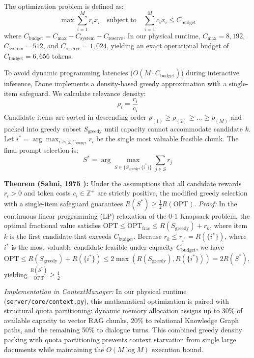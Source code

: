 \documentclass[conference,a4paper]{IEEEtran}
\begin{document}
The optimization problem is defined as:
\begin{equation}
\max \sum_{i=1}^{M} r_i x_i \quad \text{subject to} \quad \sum_{i=1}^{M} c_i x_i \le C_{\text{budget}}
\end{equation}
where $C_{\text{budget}} = C_{\text{max}} - C_{\text{system}} - C_{\text{reserve}}$. In our physical runtime, $C_{\text{max}} = 8{,}192$, $C_{\text{system}} = 512$, and $C_{\text{reserve}} = 1{,}024$, yielding an exact operational budget of $C_{\text{budget}} = 6{,}656$ tokens.

To avoid dynamic programming latencies ($O(M \cdot C_{\text{budget}})$) during interactive inference, Dione implements a density-based greedy approximation with a single-item safeguard. We calculate relevance density:
\begin{equation}
\rho_i = \frac{r_i}{c_i}
\end{equation}
Candidate items are sorted in descending order $\rho_{(1)} \ge \rho_{(2)} \ge \dots \ge \rho_{(M)}$ and packed into greedy subset $S_{\text{greedy}}$ until capacity cannot accommodate candidate $k$. Let $i^* = \arg\max_{i: c_i \le C_{\text{budget}}} r_i$ be the single most valuable feasible chunk. The final prompt selection is:
\begin{equation}
S^* = \arg\max_{S \in \{S_{\text{greedy}}, \{i^*\}\}} \sum_{j \in S} r_j
\end{equation}

\textbf{Theorem (Sahni, 1975 \cite{sahni1975approximate}):} Under the assumptions that all candidate rewards $r_i > 0$ and token costs $c_i \in \mathbb{Z}^+$ are strictly positive, the modified greedy selection with a single-item safeguard guarantees $R(S^*) \ge \frac{1}{2} R(\text{OPT})$.  
\textit{Proof:} In the continuous linear programming (LP) relaxation of the 0-1 Knapsack problem, the optimal fractional value satisfies $\text{OPT} \le \text{OPT}_{\text{frac}} \le R(S_{\text{greedy}}) + r_k$, where item $k$ is the first candidate that exceeds $C_{\text{budget}}$. Because $r_k \le r_{i^*} = R(\{i^*\})$, where $i^*$ is the most valuable candidate feasible under capacity $C_{\text{budget}}$, we have $\text{OPT} \le R(S_{\text{greedy}}) + R(\{i^*\}) \le 2 \max\left(R(S_{\text{greedy}}), R(\{i^*\})\right) = 2 R(S^*)$, yielding $\frac{R(S^*)}{\text{OPT}} \ge \frac{1}{2}$. 

\textit{Implementation in ContextManager:} In our physical runtime (\texttt{server/core/context.py}), this mathematical optimization is paired with structural quota partitioning: dynamic memory allocation assigns up to 30\% of available capacity to vector RAG chunks, 20\% to relational Knowledge Graph paths, and the remaining 50\% to dialogue turns. This combined greedy density packing with quota partitioning prevents context starvation from single large documents while maintaining the $O(M \log M)$ execution bound.
\end{document}
